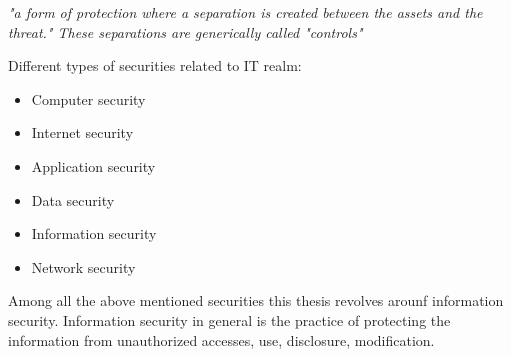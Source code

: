  
 \textit{"a form of protection where a separation is 
created between the assets and the threat." These separations are generically 
called "controls"}
\smallskip



Different types of securities related to IT realm:
\begin{itemize}
\item Computer security
\item Internet security
\item Application security
\item Data security
\item Information security
\item Network security
\end{itemize}

Among all the above mentioned securities this thesis revolves arounf information security.
Information security in general is the practice of protecting the information from unauthorized accesses, use,
disclosure, modification. 

